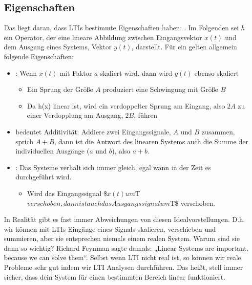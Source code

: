 \documentclass[letterpaper,10pt,english]{jupyterBook}
\begin{document}
\subsection{Eigenschaften}
\label{\detokenize{content/5_LTI:eigenschaften}}
\sphinxAtStartPar
Das liegt daran, dass LTIs bestimmte Eigenschaften haben: .
Im Folgenden sei \(h\) ein Operator, der eine lineare Abbildung zwischen Eingangsvektor \(x(t)\) und dem Ausgang eines Systems, Vektor \(y(t)\), darstellt.
Für ein  gelten allgemein folgende Eigenschaften:
\begin{itemize}
\item {} 
\sphinxAtStartPar
{}: Wenn \(x(t)\) mit Faktor \(a\) skaliert wird, dann wird \(y(t)\) ebenso skaliert
\begin{itemize}
\item {} 
\sphinxAtStartPar
Ein Sprung der Größe \(A\) produziert eine Schwingung mit Größe \(B\)

\item {} 
\sphinxAtStartPar
Da h(x) linear ist, wird ein verdoppelter Sprung am Eingang, also \(2A\) zu einer Verdopplung am Ausgang, \(2B\), führen

\end{itemize}

\item {} 
\sphinxAtStartPar
{} bedeutet Additivität: Addiere zwei Eingangssignale, \(A\) und \(B\) zusammen, sprich \(A+B\), dann ist die Antwort des linearen Systems auch die Summe der individuellen Ausgänge (\(a\) und \(b\)), also \(a+b\).

\item {} 
\sphinxAtStartPar
{}: Das Systeme verhält sich immer gleich, egal wann in der Zeit es durchgeführt wird.
\begin{itemize}
\item {} 
\sphinxAtStartPar
Wird das Eingangssignal \$\(x(t) um \)T\( verschoben, dann ist auch das Ausgangssignal um \)T\$ verschoben.

\end{itemize}

\end{itemize}

\sphinxAtStartPar
In Realität gibt es fast immer Abweichungen von diesen Idealvorstellungen. D.h. wir können mit LTIs Eingänge eines Signals skalieren, verschieben und summieren, aber sie entsprechen niemals einem realen System. Warum sind sie dann so wichtig? Richard Feynman sagte damals: „Linear Systems are important, because we can solve them“.
Selbst wenn LTI nicht real ist, so können wir reale Probleme sehr gut  indem wir LTI Analysen durchführen.
Das heißt, stell immer sicher, dass dein System für einen bestimmten Bereich linear funktioniert.
\end{document}
